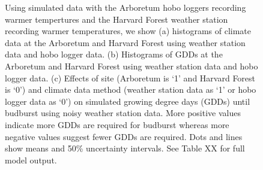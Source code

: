 \documentclass{article}\usepackage[]{graphicx}\usepackage[]{color}
\begin{document}
\begin{figure}
\begin{subfigure}{\linewidth}
      \label{fig:muploturbanws}
  \end{subfigure}
\caption{ Using simulated data with the Arboretum hobo loggers recording warmer tempertures and the Harvard Forest weather station recording warmer temperatures, we show (a) histograms of climate data at the Arboretum and Harvard Forest using weather station data and hobo logger data. (b) Histograms of GDDs at the Arboretum and Harvard Forest using weather station data and hobo logger data. (c) Effects of site (Arboretum is `1' and Harvard Forest is `0') and climate data method (weather station data as `1' or hobo logger data as `0') on simulated growing degree days (GDDs) until budburst using noisy weather station data. More positive values indicate more GDDs are required for budburst whereas more negative values suggest fewer GDDs are required. Dots and lines show means and 50\% uncertainty intervals. See Table XX for full model output.}
\label{fig:urbanws}
\end{figure}
\end{document}
